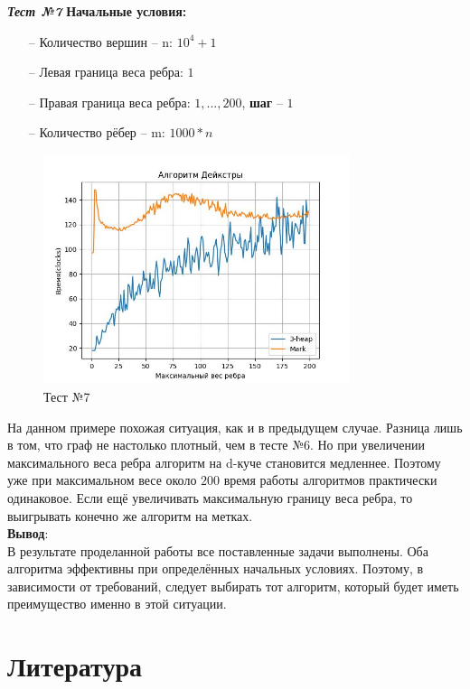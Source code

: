 \begin{text}
\begin{center}
\textbf{\textit{Тест №7}}
\textbf{Начальные условия:}

\begin{enumerate}
	\item[--] Количество вершин -- n: $10^4 + 1$
	\item[--] Левая граница веса ребра: $1$
	\item[--] Правая граница веса ребра: $1,...,200$, \textbf{шаг} -- $1$
	\item[--] Количество рёбер -- m: $1000 * n$
\end{enumerate}

\end{center}
\begin{figure}[h]
  \centering
  \includegraphics[width=0.8\textwidth]{pictures/7.jpeg}
  \caption{Тест №7}
  \label{fig:pict_7}
\end{figure}

На данном примере похожая ситуация, как и в предыдущем случае. Разница лишь в том, что граф не настолько плотный, чем в тесте №6. Но при увеличении максимального веса ребра алгоритм на d-куче становится медленнее. Поэтому уже при максимальном весе около $200$ время работы алгоритмов практически одинаковое. Если ещё увеличивать максимальную границу веса ребра, то выигрывать конечно же алгоритм на метках.\\

\textbf{Вывод}:\\
В результате проделанной работы все поставленные задачи выполнены. Оба алгоритма эффективны при определённых начальных условиях. Поэтому, в зависимости от требований, следует выбирать тот алгоритм, который будет иметь преимущество именно в этой ситуации.
\newpage

\section{Литература}


\end{text}
